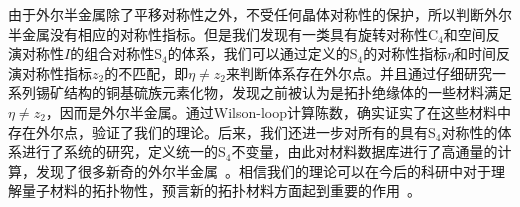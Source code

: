 由于外尔半金属除了平移对称性之外，不受任何晶体对称性的保护，所以判断外尔半金属没有相应的对称性指标。但是我们发现有一类具有旋转对称性C$_4$和空间反演对称性$I$的组合对称性S$_4$的体系，我们可以通过定义的S$_4$的对称性指标$\eta$和时间反演对称性指标$z_2$的不匹配，即$\eta \neq z_2$来判断体系存在外尔点。并且通过仔细研究一系列锡矿结构的铜基硫族元素化物，发现之前被认为是拓扑绝缘体的一些材料满足$\eta \neq z_2$，因而是外尔半金属。通过Wilson-loop计算陈数，确实证实了在这些材料中存在外尔点，验证了我们的理论。后来，我们还进一步对所有的具有S$_4$对称性的体系进行了系统的研究，定义统一的S$_4$不变量，由此对材料数据库进行了高通量的计算，发现了很多新奇的外尔半金属~\citep{tobedone2019}。相信我们的理论可以在今后的科研中对于理解量子材料的拓扑物性，预言新的拓扑材料方面起到重要的作用~\citep{gapless2020}。
